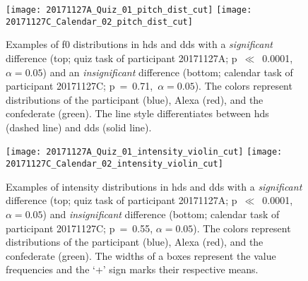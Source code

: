 \begin{figure}
	\centering
	\texttt{[image: 20171127A\_Quiz\_01\_pitch\_dist\_cut]}
	\texttt{[image: 20171127C\_Calendar\_02\_pitch\_dist\_cut]}
	\vspace{0.3cm}
	\caption[Interactions with significant and insignificant \acs{f0} distribution]
		{Examples of \ac{f0} distributions in \ac{hds} and \ac{dds} with a \emph{significant} difference (top; quiz task of participant 20171127A; p~$\ll$~0.0001,~$\alpha=0.05$) and an \emph{insignificant} difference (bottom; calendar task of participant 20171127C; p~=~0.71,~$\alpha=0.05$).
		The colors represent distributions of the participant (blue), Alexa (red), and the confederate (green).
		The line style differentiates between \ac{hds} (dashed line) and \ac{dds} (solid line).}
	\label{fig:hds_dds_dist}
\end{figure}
%
\begin{figure}
	\texttt{[image: 20171127A\_Quiz\_01\_intensity\_violin\_cut]}
	\texttt{[image: 20171127C\_Calendar\_02\_intensity\_violin\_cut]}
	\caption[Interactions with significant and insignificant intensity differences]
		{Examples of intensity distributions in \ac{hds} and \ac{dds} with a \emph{significant} difference (top; quiz task of participant 20171127A; p~$\ll$~0.0001, $\alpha=0.05$) and \emph{insignificant} difference (bottom; calendar task of participant 20171127C; p~=~0.55, $\alpha=0.05$).
		The colors represent distributions of the participant (blue), Alexa (red), and the confederate (green).
		The widths of a boxes represent the value frequencies and the \enquote*{+} sign marks their respective means.}
	\label{fig:hds_dds_violin}
\end{figure}

